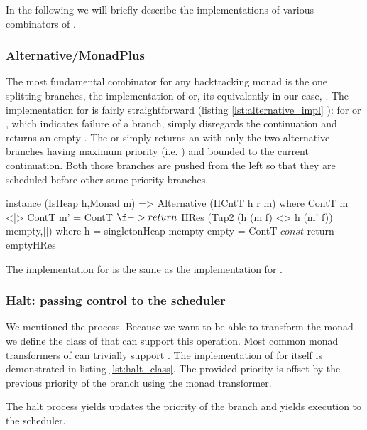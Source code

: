 In the following we will briefly describe the implementations of
various combinators of .

\subsubsection{Alternative/MonadPlus}

The most fundamental combinator for any backtracking monad is the one
splitting branches, the implementation of  or,
its equivalently in our case, . The implementation for 
is fairly straightforward (listing \ref{lst:alternative_impl} ):
for  or , which indicates failure of a
branch, simply disregards the continuation and returns an empty
. The  or \hask{<|>} simply returns an  with only the
two alternative branches having maximum priority (i.e. ) 
and bounded to the current continuation. Both those
branches are pushed from the left so that they are scheduled before
other same-priority branches.

\begin{code}
\begin{haskellcode}
instance (IsHeap h,Monad m) => Alternative (HCntT h r m) where
  ContT m <|> ContT m' = ContT $ \f -> return
    $ HRes (Tup2 (h (m f) <> h (m' f)) mempty,[])
    where
      h = singletonHeap mempty
  empty = ContT $ const $ return emptyHRes
\end{haskellcode}
  \caption{\label{lst:alternative_impl}The implementation for
     is the same as the implementation for
    .}
\end{code}


\subsubsection{Halt: passing control to the scheduler}

We mentioned the   process. Because we want to
be able to transform the  monad we define the class of
 that can support this operation. Most common monad
transformers of  can trivially support . The
implementation of  for  itself is demonstrated
in listing \ref{lst:halt_class}. The provided priority is offset by the
previous priority of the branch using the  monad transformer.

\begin{code}
  \caption{\label{lst:halt_class}The halt process yields updates the
    priority of the branch and yields execution to the scheduler.}
\end{code}


